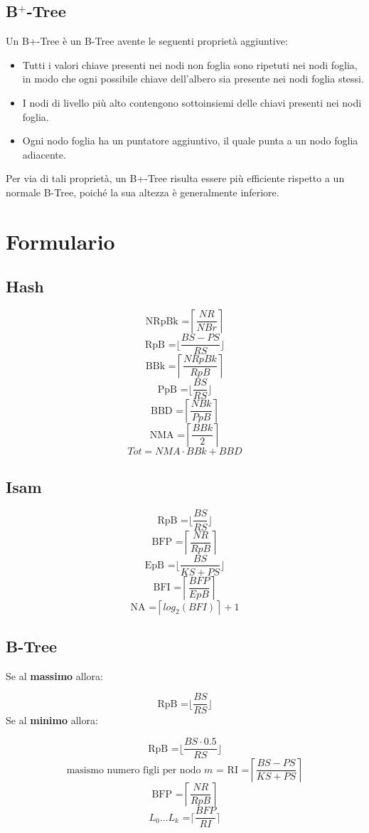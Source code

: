 \documentclass{article}
\begin{document}
\subsection{B$^+$-Tree}
Un B+-Tree è un B-Tree avente le seguenti proprietà aggiuntive:
\begin{itemize}
    \item Tutti i valori chiave presenti nei nodi non foglia sono ripetuti nei nodi foglia, in modo che ogni possibile chiave dell'albero sia presente nei nodi foglia stessi.
    \item I nodi di livello più alto contengono sottoinsiemi delle chiavi presenti nei nodi foglia.
    \item Ogni nodo foglia ha un puntatore aggiuntivo, il quale punta a un nodo foglia adiacente.
\end{itemize}
Per via di tali proprietà, un B+-Tree risulta essere più efficiente rispetto a un normale B-Tree, poiché la sua altezza è generalmente inferiore.

\pagebreak
\section{Formulario}
\subsection{Hash}
\[ \text{NRpBk =} \left\lceil \frac{NR}{NBr} \right\rceil\]
\[ \text{RpB =} \biggl\lfloor \frac{BS-PS}{RS} \biggr\rfloor\]
\[ \text{BBk =} \left\lceil \frac{NRpBk}{RpB} \right\rceil\]
\[ \text{PpB =} \biggl\lfloor \frac{BS}{RS} \biggr\rfloor\]
\[ \text{BBD =} \left\lceil \frac{NBk}{PpB} \right\rceil\]
\[ \text{NMA =} \left\lceil \frac{BBk}{2} \right\rceil\]
\[Tot = NMA \cdot BBk + BBD \]

\subsection{Isam}
\[ \text{RpB =} \biggl\lfloor \frac{BS}{RS} \biggr\rfloor\]
\[ \text{BFP =} \left\lceil \frac{NR}{RpB} \right\rceil\]
\[ \text{EpB =} \biggl\lfloor \frac{BS}{KS + PS} \biggr\rfloor\]
\[ \text{BFI =} \left\lceil \frac{BFP}{EpB} \right\rceil\]
\[ \text{NA =} \left\lceil log_2(BFI) \right\rceil +1 \]

\subsection{B-Tree}
Se al \textbf{massimo} allora:\par
\[ \text{RpB =} \biggl\lfloor \frac{BS}{RS} \biggr\rfloor\]
Se al \textbf{minimo} allora:\par
\[ \text{RpB =} \biggl\lfloor \frac{BS \cdot 0.5}{RS} \biggr\rfloor\]
\[ \text{masismo numero figli per nodo $m$ = RI =} \left\lceil \frac{BS - PS}{KS + PS} \right\rceil\]
\[ \text{BFP =} \left\lceil \frac{NR}{RpB} \right\rceil\]
\[ \text{$L_0 \dots L_k$ =} \biggl\lceil \frac{BFP}{RI} \biggr\rceil\]
\end{document}

